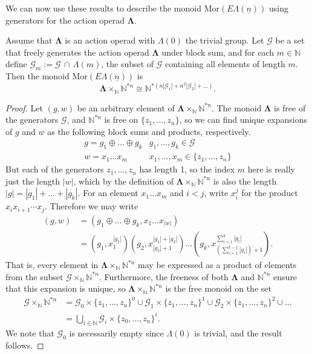 \documentclass{amsbook} %
\newcommand{\ML}{\mathbf{\Lambda}}
\newcommand{\LL}{\Lambda}
\newcommand{\ELn}{E\Lambda(\underline{n})}
\numberwithin{section}{chapter}
\begin{document}

We can now use these results to describe the monoid $\mathrm{Mor}(\ELn)$ using generators for the action operad $\ML$.

\begin{prop} \label{freemor} Assume that $\ML$ is an action operad with $\LL(0)$ the trivial group. Let $\mathcal{G}$ be a set that freely generates the action operad $\ML$ under block sum, and for each $m \in \mathbb{N}$ define $\mathcal{G}_m := \mathcal{G} \, \cap \,  \Lambda(m)$, the subset of $\mathcal{G}$ containing all elements of length $m$. Then the monoid $\mathrm{Mor}(\ELn)$ is 
  \[
    \ML \times_{\mathbb{N}} \mathbb{N}^{\ast n} \cong \mathbb{N}^{\ast (n|\mathcal{G}_1| + n^2 |\mathcal{G}_2| + \ldots)}.
  \]
\end{prop}
\begin{proof}
Let $(g, w)$ be an arbitrary element of $\ML \times_{\mathbb{N}} \mathbb{N}^{\ast n}$. The monoid $\ML$ is free of the generators $\mathcal{G}$, and $\mathbb{N}^{\ast n}$ is free on $\{z_1, \ldots, z_n\}$, so we can find unique expansions of $g$ and $w$ as the following block sums and products, respectively.
  \[
    \begin{array}{ll}
			g = g_1 \oplus \ldots \oplus g_k & g_1, \ldots, g_k \in \mathcal{G} \\
			w = x_1  \ldots x_m & x_1, \ldots, x_m \in \{z_1, \ldots, z_n\}
  	\end{array}
  \]
But each of the generators $z_1, \ldots, z_n$ has length 1, so the index $m$ here is really just the length $|w|$, which by the definition of $\ML \times_{\mathbb{N}} \mathbb{N}^{\ast n}$ is also the length $|g| = |g_1| + \ldots + |g_k|$. For an element $x_1  \ldots x_m$ and $i < j$, write $x_i^j$ for the product $x_i x_{i+1} \cdots x_j$. Therefore we may write
  \begin{align*}
  	(g, w) & = \left(g_1 \oplus \ldots \oplus g_k, x_1  \ldots  x_{|w|}\right) \\
  	& = \left(g_1, x_1^{|g_1|}\right)  \left(g_2, x_{|g_1|+1}^{|g_1|+|g_2|}\right)  \ldots  \left(g_k, x_{\left(\sum_{i=1}^{k-1}|g_i| \right)+1}^{\sum_{i=1}^{k}|g_i| }\right).
  \end{align*}
That is, every element in $\ML \times_{\mathbb{N}} \mathbb{N}^{\ast n}$ may be expressed as a product of elements from the subset $\mathcal{G} \times_{\mathbb{N}} \mathbb{N}^{\ast n}$. Furthermore, the freeness of both $\ML$ and $\mathbb{N}^{\ast n}$ ensure that this expansion is unique, so $\ML \times_{\mathbb{N}} \mathbb{N}^{\ast n}$ is the free monoid on the set 
  \begin{align*}
    \mathcal{G} \times_{\mathbb{N}} \mathbb{N}^{\ast n} &= \mathcal{G}_0 \times \{ z_1, \ldots, z_n \}^0  \cup \mathcal{G}_1 \times \{ z_1, \ldots, z_n \}^1 \cup \mathcal{G}_2 \times \{ z_1, \ldots, z_n \}^2 \cup \ldots \\
    &= \bigcup_{i \in \mathbb{N}} \mathcal{G}_i \times \{z_0, \ldots, z_n\}^i.
  \end{align*}
We note that $\mathcal{G}_0$ is necessarily empty since $\LL(0)$ is trivial, and the result follows.
\end{proof}
\end{document}
